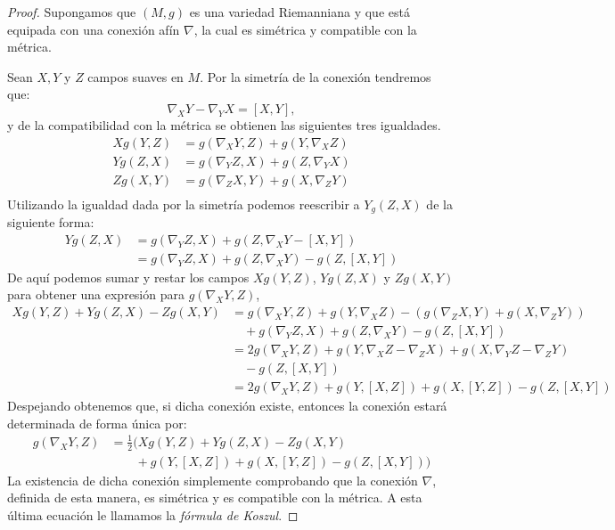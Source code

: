 \begin{proof}
	Supongamos que $(M,g)$ es una variedad Riemanniana y que está equipada con una conexión afín $\nabla$, la cual es simétrica y compatible con la métrica.

	Sean $X,Y$ y $Z$ campos suaves en $M$. Por la simetría de la conexión tendremos que:
	\[
		\nabla_{X}Y - \nabla_{Y} X = [X,Y],
	\]
	y de la compatibilidad con la métrica se obtienen las siguientes tres igualdades.
	\begin{align*}
		Xg(Y,Z) & = g(\nabla_{X}Y,Z) + g(Y,\nabla_{X}Z) \\
		Yg(Z,X) & = g(\nabla_{Y}Z,X) + g(Z,\nabla_{Y}X) \\
		Zg(X,Y) & = g(\nabla_{Z}X,Y) + g(X,\nabla_{Z}Y) \\
	\end{align*}
	Utilizando la igualdad dada por la simetría podemos reescribir a $Y_{g}(Z,X)$ de la siguiente forma:
	\begin{align*}
		Yg(Z,X) & = g(\nabla_{Y} Z, X) + g(Z, \nabla_{X}Y - [X,Y])       \\
		        & = g(\nabla_{Y} Z, X) + g(Z, \nabla_{X}Y) - g(Z, [X,Y])
	\end{align*}
	De aquí podemos sumar y restar los campos $Xg(Y,Z)$, $Yg(Z,X)$ y $Zg(X,Y)$ para obtener una expresión para $g(\nabla_X Y, Z)$,
	\begin{align*}
		Xg(Y,Z) + Yg(Z,X) - Zg(X,Y) & =  g(\nabla_{X}Y,Z) + g(Y,\nabla_{X}Z)  - (g(\nabla_{Z}X,Y) + g(X,\nabla_{Z}Y))         \\
		                            & \quad + g(\nabla_{Y} Z, X) + g(Z, \nabla_{X}Y) - g(Z, [X,Y])                            \\[12pt]
		                            & = 2 g(\nabla_{X}Y,Z) + g(Y, \nabla_{X}Z - \nabla_{Z}X) + g(X,\nabla_{Y}Z - \nabla_{Z}Y) \\
		                            & \quad - g(Z,[X,Y])                                                                      \\[12pt]
		                            & = 2g(\nabla_{X}Y,Z) + g(Y, [X,Z]) + g(X,[Y,Z]) - g(Z,[X,Y])
	\end{align*}
	Despejando obtenemos que, si dicha conexión existe, entonces la conexión estará determinada de forma única por:
	\begin{align*}
		g(\nabla_{X}Y, Z) & = \frac{1}{2} \bigl(Xg(Y,Z) + Yg(Z,X) - Zg(X,Y)      \\
		                  & \qquad + g(Y, [X,Z]) + g(X,[Y,Z]) - g(Z,[X,Y])\bigr)
	\end{align*}
	La existencia de dicha conexión simplemente comprobando que la conexión $\nabla$, definida de esta manera, es simétrica y es compatible con la métrica. A esta última ecuación le llamamos la \textit{fórmula de Koszul}.
\end{proof}

